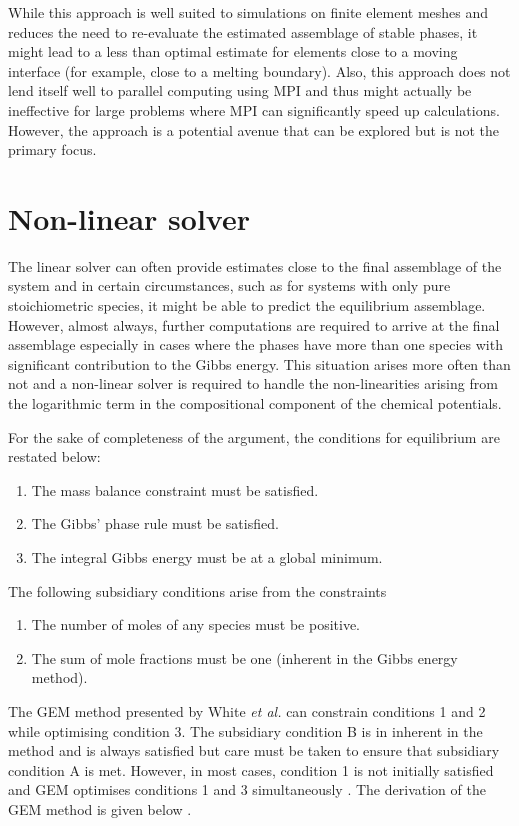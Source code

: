 	While this approach is well suited to simulations on finite element meshes and reduces the need to re-evaluate the estimated assemblage of stable phases, it might lead to a less than optimal estimate for elements close to a moving interface (for example, close to a melting boundary). Also, this approach does not lend itself well to parallel computing using MPI and thus might actually be ineffective for large problems where MPI can significantly speed up calculations. However, the approach is a potential avenue that can be explored but is not the primary focus.  
	 
\section{Non-linear solver}
	The linear solver can often provide estimates close to the final assemblage of the system and in certain circumstances, such as for systems with only pure 	stoichiometric species, it might be able to predict the equilibrium assemblage. However, almost always, further computations are required to arrive at the final assemblage especially in cases where the phases have more than one species with significant contribution to the Gibbs energy. This situation arises more often than not and a non-linear solver is required to handle the non-linearities arising from the logarithmic term in the compositional component of the chemical potentials.

	For the sake of completeness of the argument, the conditions for equilibrium are restated below:
	\begin{enumerate}
		\item The mass balance constraint must be satisfied.
		\item The Gibbs' phase rule must be satisfied.
		\item The integral Gibbs energy must be at a global minimum.
	\end{enumerate}
	
	The following subsidiary conditions arise from the constraints
	\begin{enumerate}[label=\Alph*.]
		\item The number of moles of any species must be positive.
		\item The sum of mole fractions must be one (inherent in the Gibbs energy method).
	\end{enumerate}
	
	The GEM method presented by White \textit{et al.} \cite{White:58} can constrain conditions 1 and 2 while optimising condition 3.  The subsidiary condition B is in inherent in the method and is always satisfied but care must be taken to ensure that subsidiary condition A is met. However, in most cases, condition 1 is not initially satisfied and GEM optimises conditions 1 and 3 simultaneously \cite{Eriksson71}. The derivation of the GEM method is  given below \cite{Piro11b}. 
	
